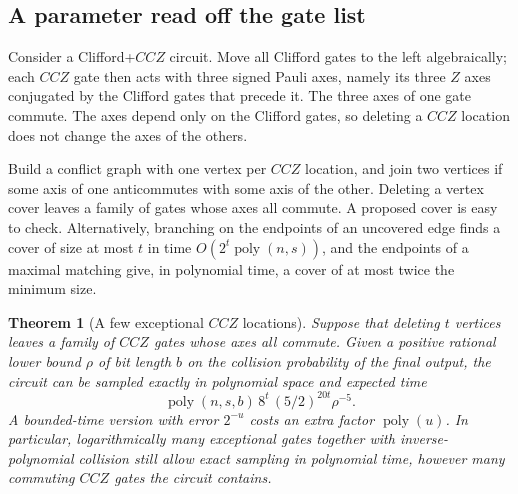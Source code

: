 \documentclass[a4paper,onecolumn,11pt,unpublished]{quantumarticle}
\theoremstyle{plain}
\newtheorem{theorem}{Theorem}
\theoremstyle{remark}
\DeclareMathOperator{\poly}{poly}
\begin{document}
\subsection{A parameter read off the gate list}

Consider a Clifford+$CCZ$ circuit. Move all Clifford gates to the left algebraically; each $CCZ$ gate then acts with three signed Pauli axes, namely its three $Z$ axes conjugated by the Clifford gates that precede it. The three axes of one gate commute. The axes depend only on the Clifford gates, so deleting a $CCZ$ location does not change the axes of the others.

Build a conflict graph with one vertex per $CCZ$ location, and join two vertices if some axis of one anticommutes with some axis of the other. Deleting a vertex cover leaves a family of gates whose axes all commute. A proposed cover is easy to check. Alternatively, branching on the endpoints of an uncovered edge finds a cover of size at most $t$ in time $O(2^t\poly(n,s))$, and the endpoints of a maximal matching give, in polynomial time, a cover of at most twice the minimum size.

\begin{theorem}[A few exceptional $CCZ$ locations]\label{thm:defect}
Suppose that deleting $t$ vertices leaves a family of $CCZ$ gates whose axes all commute. Given a positive rational lower bound $\rho$ of bit length $b$ on the collision probability of the final output, the circuit can be sampled exactly in polynomial space and expected time
\[
\poly(n,s,b)\,8^t\,(5/2)^{20t}\rho^{-5}.
\]
A bounded-time version with error $2^{-u}$ costs an extra factor $\poly(u)$. In particular, logarithmically many exceptional gates together with inverse-polynomial collision still allow exact sampling in polynomial time, however many commuting $CCZ$ gates the circuit contains.
\end{theorem}
\end{document}
